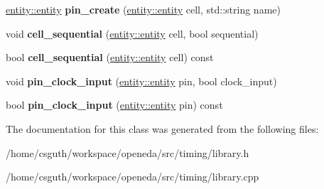 \begin{DoxyCompactItemize}
\item 
\hypertarget{classophidian_1_1timing_1_1library_a0a980f67c4360ca8aa9bf13055fb90b2}{\hyperlink{classophidian_1_1entity_1_1entity}{entity\-::entity} {\bfseries pin\-\_\-create} (\hyperlink{classophidian_1_1entity_1_1entity}{entity\-::entity} cell, std\-::string name)}\label{classophidian_1_1timing_1_1library_a0a980f67c4360ca8aa9bf13055fb90b2}

\item 
\hypertarget{classophidian_1_1timing_1_1library_a6e03381495e1e32c755008b599d958f9}{void {\bfseries cell\-\_\-sequential} (\hyperlink{classophidian_1_1entity_1_1entity}{entity\-::entity} cell, bool sequential)}\label{classophidian_1_1timing_1_1library_a6e03381495e1e32c755008b599d958f9}

\item 
\hypertarget{classophidian_1_1timing_1_1library_a6f7ffe00a84533941b821962b518e6bb}{bool {\bfseries cell\-\_\-sequential} (\hyperlink{classophidian_1_1entity_1_1entity}{entity\-::entity} cell) const }\label{classophidian_1_1timing_1_1library_a6f7ffe00a84533941b821962b518e6bb}

\item 
\hypertarget{classophidian_1_1timing_1_1library_af22828047fda8cd05b0409d0b1bba055}{void {\bfseries pin\-\_\-clock\-\_\-input} (\hyperlink{classophidian_1_1entity_1_1entity}{entity\-::entity} pin, bool clock\-\_\-input)}\label{classophidian_1_1timing_1_1library_af22828047fda8cd05b0409d0b1bba055}

\item 
\hypertarget{classophidian_1_1timing_1_1library_aefbce0ea37e99aaf16808b6420b77764}{bool {\bfseries pin\-\_\-clock\-\_\-input} (\hyperlink{classophidian_1_1entity_1_1entity}{entity\-::entity} pin) const }\label{classophidian_1_1timing_1_1library_aefbce0ea37e99aaf16808b6420b77764}

\end{DoxyCompactItemize}


The documentation for this class was generated from the following files\-:\begin{DoxyCompactItemize}
\item 
/home/csguth/workspace/openeda/src/timing/library.\-h\item 
/home/csguth/workspace/openeda/src/timing/library.\-cpp\end{DoxyCompactItemize}
